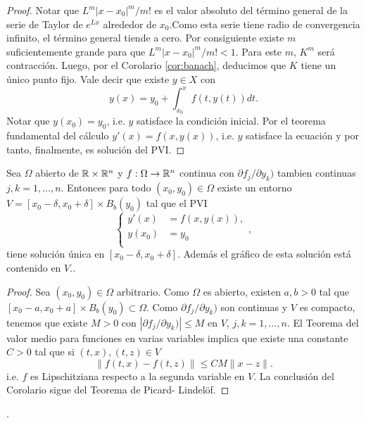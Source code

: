\begin{proof}
Notar que $L^m|x-x_0|^m/m!$ es el valor absoluto del término general de la serie de Taylor de $e^{Lx}$ alrededor de $x_0$.Como esta serie tiene radio de convergencia infinito, el término general tiende a cero. Por consiguiente existe $m$ suficientemente grande para que $L^m|x-x_0|^m/m!<1$. Para este $m$, $K^m$ será contracción. Luego, por el Corolario \ref{cor:banach},  deducimos que $K$ tiene un único punto fijo. Vale decir que existe $y\in X$ con
\[
 y(x)=y_0+\int_{x_0}^xf(t,y(t))dt.
\]
Notar que $y(x_0)=y_0$, i.e. $y$ satisface la condición inicial. Por el teorema fundamental del cálculo $y'(x)=f(x,y(x))$, i.e. $y$ satisface la ecuación y por tanto, finalmente, es solución del PVI.\end{proof}


\begin{corolario}{} Sea $\Omega$ abierto de $\mathbb{R}\times \mathbb{R}^n$ y $f:\Omega\to\mathbb{R}^n$ continua con $\partial f_j/\partial y_k)$ tambien continuas $j,k=1,\ldots,n$. Entonces para todo $(x_0,y_0)\in\Omega$ existe un entorno $V=[x_0-\delta,x_0+\delta]\times B_b(y_0)$ tal que el PVI
 \[
 \left\{\begin{array}{ll}
	  y'(x)&=f(x,y(x)),\\
	  y(x_0)&=y_0\\         
        \end{array}
\right. ,
\]
tiene solución única en $[x_0-\delta,x_0+\delta]$. Además el gráfico de esta solución está contenido en $V$..
\end{corolario}

\begin{proof} Sea $(x_0,y_0)\in\Omega$ arbitrario. Como $\Omega$ es abierto, existen $a,b>0$ tal que $[x_0-a,x_0+a]\times B_b(y_0)\subset \Omega$. Como $\partial f_j/\partial y_k)$ son continuas y $V$ es compacto, tenemos que existe $M>0$ con $|\partial f_j/\partial y_k)|\leq M$ en $V$, $j,k=1,\ldots,n$. El Teorema del valor medio para funciones en varias variables implica que existe una constante $C>0$ tal que si $(t,x),(t,z)\in V$
\[\|f(t,x)-f(t,z)\|\leq C M\|x-z\|.\]
i.e. $f$ es Lipschitziana respecto a la segunda variable en $V$. La conclusión del Corolario sigue del Teorema de Picard- Lindelöf. 
\end{proof}


   
\nocite{JorgeSotomayor513}.


% 
% 
%   
%   
